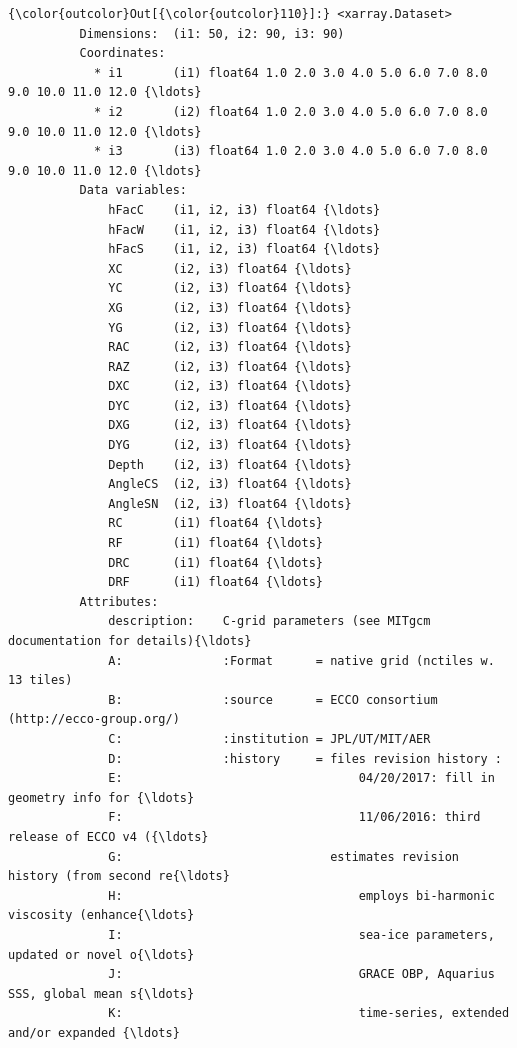 \documentclass[11pt]{article}
\begin{document}
\begin{Verbatim}[commandchars=\\\{\}]
{\color{outcolor}Out[{\color{outcolor}110}]:} <xarray.Dataset>
          Dimensions:  (i1: 50, i2: 90, i3: 90)
          Coordinates:
            * i1       (i1) float64 1.0 2.0 3.0 4.0 5.0 6.0 7.0 8.0 9.0 10.0 11.0 12.0 {\ldots}
            * i2       (i2) float64 1.0 2.0 3.0 4.0 5.0 6.0 7.0 8.0 9.0 10.0 11.0 12.0 {\ldots}
            * i3       (i3) float64 1.0 2.0 3.0 4.0 5.0 6.0 7.0 8.0 9.0 10.0 11.0 12.0 {\ldots}
          Data variables:
              hFacC    (i1, i2, i3) float64 {\ldots}
              hFacW    (i1, i2, i3) float64 {\ldots}
              hFacS    (i1, i2, i3) float64 {\ldots}
              XC       (i2, i3) float64 {\ldots}
              YC       (i2, i3) float64 {\ldots}
              XG       (i2, i3) float64 {\ldots}
              YG       (i2, i3) float64 {\ldots}
              RAC      (i2, i3) float64 {\ldots}
              RAZ      (i2, i3) float64 {\ldots}
              DXC      (i2, i3) float64 {\ldots}
              DYC      (i2, i3) float64 {\ldots}
              DXG      (i2, i3) float64 {\ldots}
              DYG      (i2, i3) float64 {\ldots}
              Depth    (i2, i3) float64 {\ldots}
              AngleCS  (i2, i3) float64 {\ldots}
              AngleSN  (i2, i3) float64 {\ldots}
              RC       (i1) float64 {\ldots}
              RF       (i1) float64 {\ldots}
              DRC      (i1) float64 {\ldots}
              DRF      (i1) float64 {\ldots}
          Attributes:
              description:    C-grid parameters (see MITgcm documentation for details){\ldots}
              A:              :Format      = native grid (nctiles w. 13 tiles)
              B:              :source      = ECCO consortium (http://ecco-group.org/)
              C:              :institution = JPL/UT/MIT/AER
              D:              :history     = files revision history :
              E:                                 04/20/2017: fill in geometry info for {\ldots}
              F:                                 11/06/2016: third release of ECCO v4 ({\ldots}
              G:                             estimates revision history (from second re{\ldots}
              H:                                 employs bi-harmonic viscosity (enhance{\ldots}
              I:                                 sea-ice parameters, updated or novel o{\ldots}
              J:                                 GRACE OBP, Aquarius SSS, global mean s{\ldots}
              K:                                 time-series, extended and/or expanded {\ldots}

\end{Verbatim}
\end{document}
